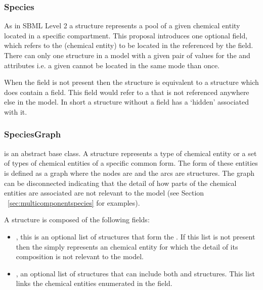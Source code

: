 \documentclass{cekarticle}
\begin{document}
\subsubsection{Species}
\label{sec:species}

As in SBML Level 2 a  structure represents a pool
of a given chemical entity located in a specific compartment. This
proposal introduces one optional  field,
 which refers to the 
(chemical entity) to be located in the 
referenced by the  field.  There can only one
 structure in a model with a given pair of values
for the  and  attributes
i.e. a given  cannot be located in the same
 mode than once.

When the  field is not present then the
 structure is equivalent to a 
structure which does contain a  field. This
field would refer to a  that is not referenced
anywhere else in the model. In short a  structure
without a  field has a `hidden'
 associated with it.

\subsubsection{SpeciesGraph}

 is an abstract base class. A
 structure represents a type of chemical
entity or a set of types of chemical entities of a specific common
form. The form of these entities is defined as a graph where the
nodes are  and the arcs are
 structures.  The graph can be disconnected indicating
that the detail of how parts of the chemical entities are
associated are not relevant to the model (see Section
~\ref{sec:multicomponentspecies} for examples).

A  structure is composed of the following fields:

\begin{itemize}

\item {}, this is an optional list of 
structures that form the .  If this list is not present
then the  simply represents an chemical entity for which the detail
of its composition is not relevant to the model.

\item {}, an optional list of  structures
that can include both  and 
structures. This list links the chemical entities enumerated in
the  field.

\end{itemize}
\end{document}
